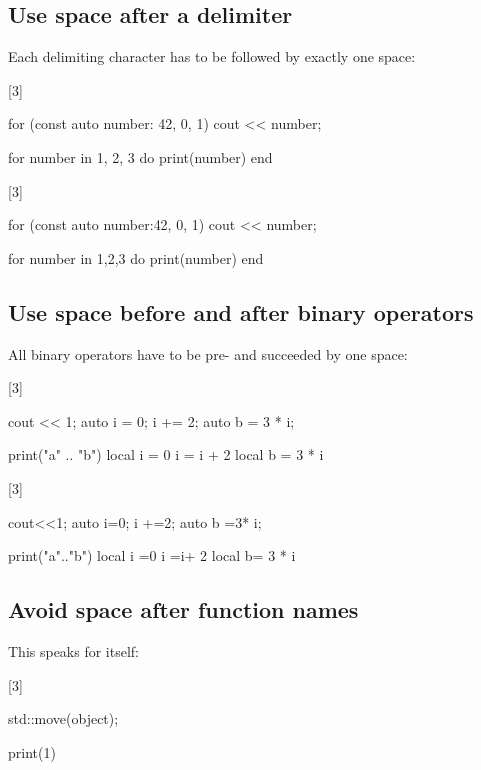 \documentclass[a4paper,11pt]{scrreprt}
\newcommand{\marginMarker}[1]{%
\marginnote{%
    \hfill%
		\Huge{#1}%
}[3\baselineskip]%
}
\newcommand{\conforming}{%
\marginMarker{\textcolor{green}{\ding{51}}}%
}
\newcommand{\nonconforming}{%
\marginMarker{\textcolor{red}{\ding{55}}}%
}
\begin{document}
\subsection{Use space after a delimiter}
Each delimiting character has to be followed by exactly one space:

\conforming{}
\begin{cppBox}[showspaces]
for (const auto number: {42, 0, 1}) {
    cout << number;
}
\end{cppBox}
\begin{luaBox}[showspaces]
for number in {1, 2, 3} do
    print(number)
end
\end{luaBox}

\nonconforming{}
\begin{cppBox}[showspaces]
for (const auto number:{42, 0, 1}) {
    cout << number;
}
\end{cppBox}
\begin{luaBox}[showspaces]
for number in {1,2,3} do
    print(number)
end
\end{luaBox}

\subsection{Use space before and after binary operators}
All binary operators have to be pre- and succeeded by one space:

\conforming{}
\begin{cppBox}[showspaces]
cout << 1;
auto i = 0;
i += 2;
auto b = 3 * i;
\end{cppBox}
\begin{luaBox}[showspaces]
print("a" .. "b")
local i = 0
i = i + 2
local b = 3 * i
\end{luaBox}

\nonconforming{}
\begin{cppBox}[showspaces]
cout<<1;
auto i=0;
i +=2;
auto b =3*  i;
\end{cppBox}
\begin{luaBox}[showspaces]
print("a".."b")
local i =0
i =i+ 2
local b= 3  * i
\end{luaBox}

\subsection{Avoid space after function names}
This speaks for itself:

\conforming{}
\begin{cppBox}[showspaces]
std::move(object);
\end{cppBox}
\begin{luaBox}[showspaces]
print(1)
\end{luaBox}
\end{document}
